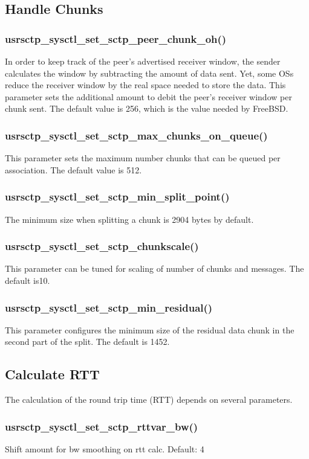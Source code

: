 \documentclass[a4paper]{article}
\begin{document}
\subsection{Handle Chunks}
\subsubsection{usrsctp\_sysctl\_set\_sctp\_peer\_chunk\_oh()}
In order to keep track of the peer's advertised receiver window, the sender calculates the window by
subtracting the amount of data sent. Yet, some OSs reduce the receiver window by the real space needed
to store the data. This parameter sets the additional amount to debit the peer's receiver window per
chunk sent. The default value is 256, which is the value needed by FreeBSD.

\subsubsection{usrsctp\_sysctl\_set\_sctp\_max\_chunks\_on\_queue()}
This parameter sets the maximum number chunks that can be queued per association. The default 
value is 512.

\subsubsection{usrsctp\_sysctl\_set\_sctp\_min\_split\_point()}
The minimum size when splitting a chunk is 2904 bytes by default.

\subsubsection{usrsctp\_sysctl\_set\_sctp\_chunkscale()}
This parameter can be tuned for scaling of number of chunks and messages. The default is10.						
\subsubsection{usrsctp\_sysctl\_set\_sctp\_min\_residual()}
This parameter configures the minimum size of the residual data chunk in the second
part of the split. The default is 1452.


\subsection{Calculate RTT}
The calculation of the round trip time (RTT) depends on several parameters.

\subsubsection{usrsctp\_sysctl\_set\_sctp\_rttvar\_bw()}
Shift amount for bw smoothing on rtt calc. Default: 4
\end{document}
